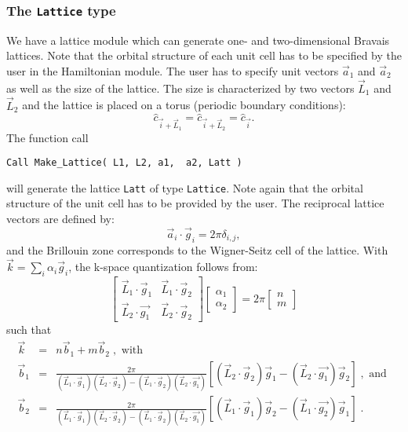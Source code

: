 \documentclass{SciPost}
\begin{document}
\subsubsection{The \texttt{Lattice} type}\label{sec:latt}
%
We have a lattice module  which can generate one- and two-dimensional Bravais lattices.
Note that the orbital structure of each unit cell has to be specified by the user in the Hamiltonian module. 
 The user has to specify unit vectors $\vec{a}_1$ and $\vec{a}_2$ as well as the size of the  lattice. The size is  characterized by  two vectors $\vec{L}_1$ and $\vec{L}_2$   and  the lattice is placed on a torus 
 (periodic boundary conditions): 
\begin{equation}
	\hat{c}_{\vec{i} + \vec{L}_1 }  = \hat{c}_{\vec{i} + \vec{L}_2 }  = \hat{c}_{\vec{i}}.
\end{equation}
The function call 
\lstset{style=fortran}
\begin{lstlisting} 
Call Make_Lattice( L1, L2, a1,  a2, Latt )
\end{lstlisting}
will generate the lattice   \texttt{Latt} of type \texttt{Lattice}.   Note again that  the orbital structure of the unit cell has to be provided by the user.    The reciprocal lattice vectors are defined by: 
\begin{equation}
\label{Latt.G.eq}
	\vec{a}_i  \cdot \vec{g}_i = 2 \pi \delta_{i,j}, 
\end{equation}
and the Brillouin zone corresponds to the Wigner-Seitz cell of the lattice. 
With $\vec{k} = \sum_{i} \alpha_i  \vec{g}_i $, the  k-space quantization follows from: 
\begin{equation}
\begin{bmatrix}
	\vec{L}_1 \cdot \vec{g}_1  &  \vec{L}_1 \cdot \vec{g}_2  \\
	\vec{L}_2  \cdot \vec{g_1} & \vec{L}_2 \cdot  \vec{g}_2  
\end{bmatrix}
\begin{bmatrix}
   \alpha_1 \\
   \alpha_2
\end{bmatrix}
=
2 \pi 
\begin{bmatrix}
   n \\
   m
\end{bmatrix}
\end{equation}
such that 
\begin{eqnarray}
\label{k.quant.eq}
     \vec{k} &=&  n \vec{b}_1  + m \vec{b}_2\;, \text{ with}\nonumber\\
     \vec{b}_1 &=& \frac{2 \pi}{ (\vec{L}_1 \cdot \vec{g}_1)  (\vec{L}_2 \cdot  \vec{g}_2 )  - (\vec{L}_1 \cdot \vec{g}_2) (\vec{L}_2  \cdot \vec{g_1} ) }   \left[  (\vec{L}_2 \cdot  \vec{g}_2) \vec{g}_1 -   (\vec{L}_2  \cdot \vec{g_1} ) \vec{g}_2 \right]\;, \text{   and  } \nonumber \\ 
      \vec{b}_2 &=& \frac{2 \pi}{ (\vec{L}_1 \cdot \vec{g}_1)  (\vec{L}_2 \cdot  \vec{g}_2 )  - (\vec{L}_1 \cdot \vec{g}_2) (\vec{L}_2  \cdot \vec{g_1} ) }   
           \left[  (\vec{L}_1 \cdot  \vec{g}_1) \vec{g}_2 -   (\vec{L}_1  \cdot \vec{g_2} ) \vec{g}_1 \right] \;.
\end{eqnarray}
\end{document}
